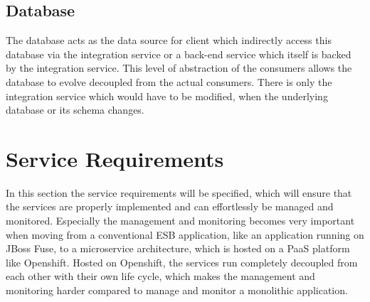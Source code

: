 \subsection{Database}
\label{sec:esboc-design-service-database}
The database acts as the data source for client which indirectly access this database via the integration service or a back-end service which itself is backed by the integration service. This level of abstraction of the consumers allows the database to evolve decoupled from the actual consumers. There is only the integration service which would have to be modified, when the underlying database or its schema changes.

\section{Service Requirements}
\label{sec:esboc-requirements-service}
In this section the service requirements will be specified, which will ensure that the services are properly implemented and can effortlessly be managed and monitored. Especially the management and monitoring becomes very important when moving from a conventional ESB application, like an application running on JBoss Fuse, to a microservice architecture, which is hosted on a PaaS platform like Openshift. Hosted on Openshift, the services run completely decoupled from each other with their own life cycle, which makes the management and monitoring harder compared to manage and monitor a monolithic application.

